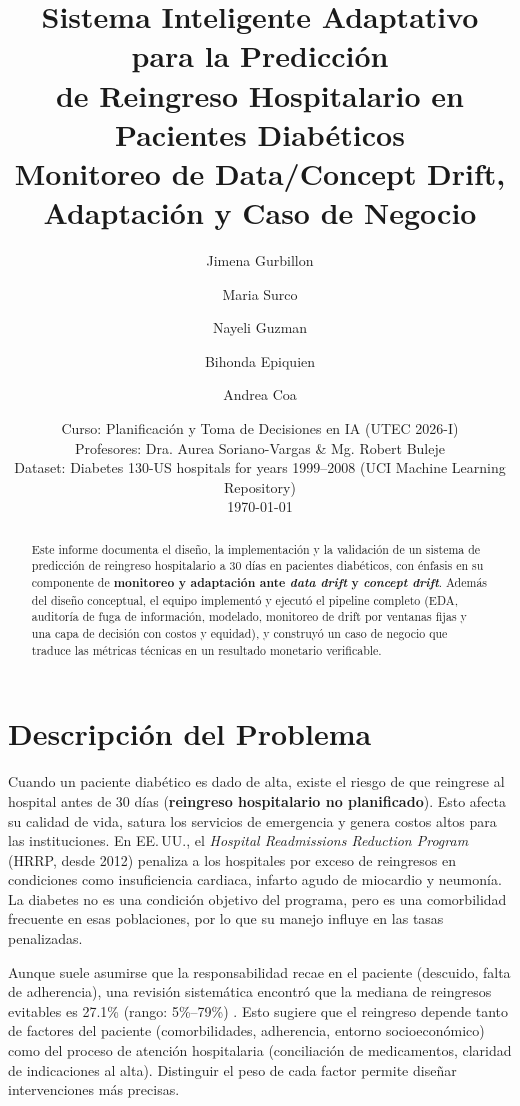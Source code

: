 \documentclass[11pt,a4paper]{article}
\title{\textbf{Sistema Inteligente Adaptativo para la Predicción\\ de Reingreso Hospitalario en Pacientes Diabéticos}\\[0.3em]
\large Monitoreo de Data/Concept Drift, Adaptación y Caso de Negocio}
\author{Jimena Gurbillon \and Maria Surco \and Nayeli Guzman \and Bihonda Epiquien \and Andrea Coa}
\date{Curso: Planificación y Toma de Decisiones en IA (UTEC 2026-I) \\
Profesores: Dra. Aurea Soriano-Vargas \& Mg. Robert Buleje \\
Dataset: Diabetes 130-US hospitals for years 1999--2008 (UCI Machine Learning Repository) \\[0.5em]
\today}
\begin{document}
\maketitle
\thispagestyle{empty}

\begin{abstract}
\noindent Este informe documenta el diseño, la implementación y la validación de un sistema de predicción de reingreso hospitalario a 30 días en pacientes diabéticos, con énfasis en su componente de \textbf{monitoreo y adaptación ante \emph{data drift} y \emph{concept drift}}. Además del diseño conceptual, el equipo implementó y ejecutó el pipeline completo (EDA, auditoría de fuga de información, modelado, monitoreo de drift por ventanas fijas y una capa de decisión con costos y equidad), y construyó un caso de negocio que traduce las métricas técnicas en un resultado monetario verificable.
\end{abstract}

\newpage
\tableofcontents
\newpage

\section{Descripción del Problema}

Cuando un paciente diabético es dado de alta, existe el riesgo de que reingrese al hospital antes de 30 días (\textbf{reingreso hospitalario no planificado}). Esto afecta su calidad de vida, satura los servicios de emergencia y genera costos altos para las instituciones. En EE.\,UU., el \emph{Hospital Readmissions Reduction Program} (HRRP, desde 2012) penaliza a los hospitales por exceso de reingresos en condiciones como insuficiencia cardiaca, infarto agudo de miocardio y neumonía. La diabetes no es una condición objetivo del programa, pero es una comorbilidad frecuente en esas poblaciones, por lo que su manejo influye en las tasas penalizadas.

Aunque suele asumirse que la responsabilidad recae en el paciente (descuido, falta de adherencia), una revisión sistemática encontró que la mediana de reingresos evitables es 27.1\% (rango: 5\%--79\%) \cite{vanwalraven2011}. Esto sugiere que el reingreso depende tanto de factores del paciente (comorbilidades, adherencia, entorno socioeconómico) como del proceso de atención hospitalaria (conciliación de medicamentos, claridad de indicaciones al alta). Distinguir el peso de cada factor permite diseñar intervenciones más precisas.
\end{document}
